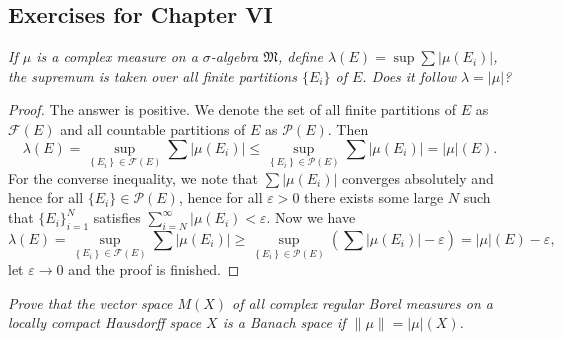 \subsection{Exercises for Chapter VI}
\begin{problem}\em
If $\mu$ is a complex measure on a $\sigma$-algebra $\mathfrak{M}$, define $\lambda(E)=\sup\sum|\mu(E_i)|$, the supremum is taken over all finite partitions $\{E_i\}$ of $E$. Does it follow $\lambda=|\mu|$?
\end{problem}
\begin{proof}
The answer is positive. We denote the set of all finite partitions of $E$ as $\mathcal{F}(E)$ and all countable partitions of $E$ as $\mathcal{P}(E)$. Then 
$$
\lambda \left( E \right) =\mathop {\mathrm{sup}} \limits_{\left\{ E_i \right\} \in \mathcal{F} \left( E \right)}\sum{\left| \mu \left( E_i \right) \right|}\le \mathop {\mathrm{sup}} \limits_{\left\{ E_i \right\} \in \mathcal{P} \left( E \right)}\sum{\left| \mu \left( E_i \right) \right|}=\left| \mu \right|\left( E \right) .
$$
For the converse inequality, we note that $\sum|\mu(E_i)|$ converges absolutely and hence for all $\{E_i\}\in\mathcal{P}(E)$, hence for all $\varepsilon>0$ there exists some large $N$ such that $\{E_i\}_{i=1}^N$ satisfies $\sum_{i=N}^\infty|\mu(E_i)<\varepsilon$. Now we have 
$$
\lambda \left( E \right) =\mathop {\mathrm{sup}} \limits_{\left\{ E_i \right\} \in \mathcal{F} \left( E \right)}\sum{\left| \mu \left( E_i \right) \right|}\ge \mathop {\mathrm{sup}} \limits_{\left\{ E_i \right\} \in \mathcal{P} \left( E \right)}\left( \sum{\left| \mu \left( E_i \right) \right|-\varepsilon} \right) =\left| \mu \right|\left( E \right) -\varepsilon ,
$$
let $\varepsilon\to 0$ and the proof is finished.
\end{proof}
\begin{problem}\em
Prove that the vector space $M(X)$ of all complex regular Borel measures on a locally compact Hausdorff space $X$ is a Banach space if $\|\mu\|=|\mu|(X)$.
\end{problem}
